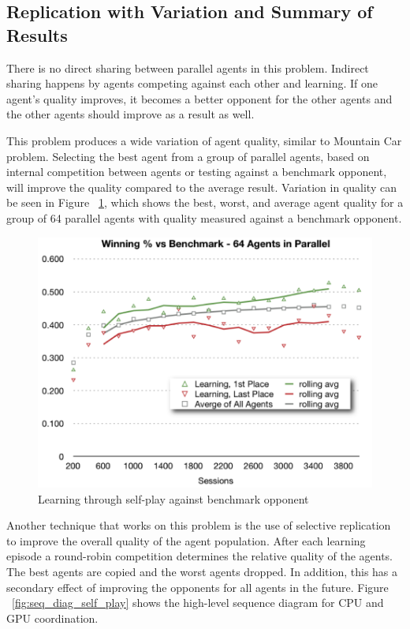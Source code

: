 \begin{flushleft}



\subsection{Replication with Variation and Summary of Results}
There is no direct sharing between parallel agents in this problem.  Indirect sharing happens by agents competing against each other and learning.  If one agent’s quality improves, it becomes a better opponent for the other agents and the other agents should improve as a result as well.

This problem produces a wide variation of agent quality, similar to Mountain Car problem.  Selecting the best agent from a group of parallel agents, based on internal competition between agents or testing against a benchmark opponent, will improve the quality compared to the average result.  Variation in quality can be seen in Figure ~\ref{fig:learn_v_benchmark}, which shows the best, worst, and average agent quality for a group of 64 parallel agents with quality measured against a benchmark opponent.

\end{flushleft}
\begin{figure}[hbtp]
\center
\includegraphics[scale=0.8]{fig18}
\caption{Learning through self-play against benchmark opponent}
\label{fig:learn_v_benchmark}
\end{figure}
\begin{flushleft}


Another technique that works on this problem is the use of selective replication to improve the overall quality of the agent population.  After each learning episode a round-robin competition determines the relative quality of the agents.  The best agents are copied and the worst agents dropped.  In addition, this has a secondary effect of improving the opponents for all agents in the future.  Figure ~\ref{fig:seq_diag_self_play} shows the high-level sequence diagram for CPU and GPU coordination.

\end{flushleft}

